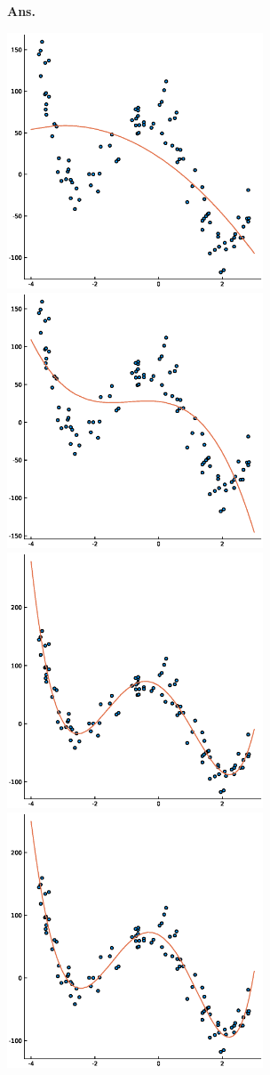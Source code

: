 \documentclass{article}
\newcommand{\showsolution}[1]{\textbf{Ans.}\;#1}
\begin{document}
\begin{enumerate}
\showsolution{
	\begin{center}
		\includegraphics[width=3in]{img/hw1_p2_o2.eps}
		\includegraphics[width=3in]{img/hw1_p2_o3.eps}
		\includegraphics[width=3in]{img/hw1_p2_o4.eps}
		\includegraphics[width=3in]{img/hw1_p2_o5.eps}

\end{center}}
\end{enumerate}
\end{document}

